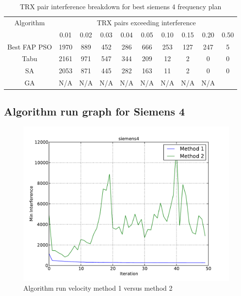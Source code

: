 \begin{table}[H]
\centering
	\begin{tabular}{cccccccccc}
	\toprule
    Algorithm & \multicolumn{9}{c}{TRX pairs exceeding interference}\\
    & 0.01 & 0.02 & 0.03 & 0.04 & 0.05 & 0.10 & 0.15 & 0.20 & 0.50 \\
    \midrule
    Best FAP PSO & 1970 & 889 & 452 & 286 & 666 & 253 & 127 & 247 & 5\\
    Tabu & 2161 & 971 & 547 & 344 & 209 & 12 & 2 & 0 & 0\\
    SA & 2053 & 871 & 445 & 282 & 163 & 11 & 2 & 0 & 0\\
    GA & \scriptsize{N/A} & \scriptsize{N/A} & \scriptsize{N/A} & \scriptsize{N/A} & \scriptsize{N/A} & \scriptsize{N/A} & \scriptsize{N/A} & \scriptsize{N/A}  \\
    \bottomrule
	\end{tabular}
\caption{TRX pair interference breakdown for best siemens 4 frequency plan}
\label{tab:breakdown-siem4m1}
\end{table}
\subsection{Algorithm run graph for Siemens 4}
\begin{figure}[H]
	\begin{centering}
    \includegraphics[scale=0.5]{../Implementation/data-cruncher/graph/siemens4.pdf}
	\caption{Algorithm run velocity method 1 versus method 2}
	\label{fig:siem4graph}
	\end{centering}
\end{figure}



